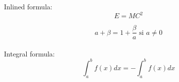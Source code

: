 \documentclass{article}
\begin{document}
Inlined formula:
$$E = MC^{2}$$

$$ a + \beta = 1 + \frac{\beta}{a} \text{ si } a \neq 0 $$\\

Integral formula:
$$ \int_{a}^{b}f(x) dx = -\int_{a}^{b}f(x) dx $$
\end{document}
